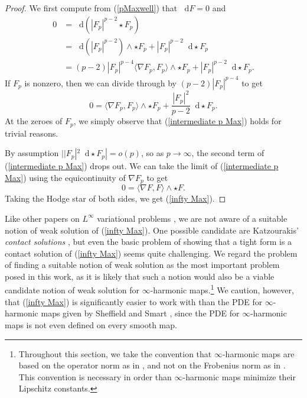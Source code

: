 \documentclass[reqno,11pt]{amsart}
\newcommand*\dif{\mathop{}\!\mathrm{d}}
\newcommand{\dfn}[1]{\emph{#1}\index{#1}}
\theoremstyle{definition}
\numberwithin{equation}{section}
\begin{document}
\begin{proof}
We first compute from (\ref{pMaxwell}) that $\dif F = 0$ and
\begin{align*}
0
&= \dif(|F_p|^{p - 2} \star F_p) \\
&= \dif(|F_p|^{p - 2}) \wedge \star F_p + |F_p|^{p - 2} \dif \star F_p \\
&= (p - 2) |F_p|^{p - 4} \langle \nabla F_p, F_p\rangle \wedge \star F_p + |F_p|^{p - 2} \dif \star F_p.
\end{align*}
If $F_p$ is nonzero, then we can divide through by $(p - 2) |F_p|^{p - 4}$ to get
\begin{equation}\label{intermediate p Max}
0 = \langle\nabla F_p, F_p\rangle \wedge \star F_p + \frac{|F_p|^2}{p - 2} \dif \star F_p.
\end{equation}
At the zeroes of $F_p$, we simply observe that (\ref{intermediate p Max}) holds for trivial reasons.

By assumption $||F_p|^2 \dif \star F_p| = o(p)$, so as $p \to \infty$, the second term of (\ref{intermediate p Max}) drops out.
We can take the limit of (\ref{intermediate p Max}) using the equicontinuity of $\nabla F_p$ to get
$$0 = \langle \nabla F, F \rangle \wedge \star F.$$
Taking the Hodge star of both sides, we get (\ref{infty Max}).
\end{proof}

Like other papers on $L^\infty$ variational problems \cite{Barron08,Sheffield12,daskalopoulos2022}, we are not aware of a suitable notion of weak solution of (\ref{infty Max}).
One possible candidate are Katzourakis' \dfn{contact solutions} \cite{Katzourakis2018OnAV}, but even the basic problem of showing that a tight form is a contact solution of (\ref{infty Max}) seems quite challenging.
We regard the problem of finding a suitable notion of weak solution as the most important problem posed in this work, as it is likely that such a notion would also be a viable candidate notion of weak solution for $\infty$-harmonic maps.\footnote{Throughout this section, we take the convention that $\infty$-harmonic maps are based on the operator norm as in \cite{Sheffield12, daskalopoulos2022}, and not on the Frobenius norm as in \cite{Ou12}. This convention is necessary in order than $\infty$-harmonic maps minimize their Lipschitz constants.}
We caution, however, that (\ref{infty Max}) is significantly easier to work with than the PDE for $\infty$-harmonic maps given by Sheffield and Smart \cite{Sheffield12}, since the PDE for $\infty$-harmonic maps is not even defined on every smooth map.
\end{document}
